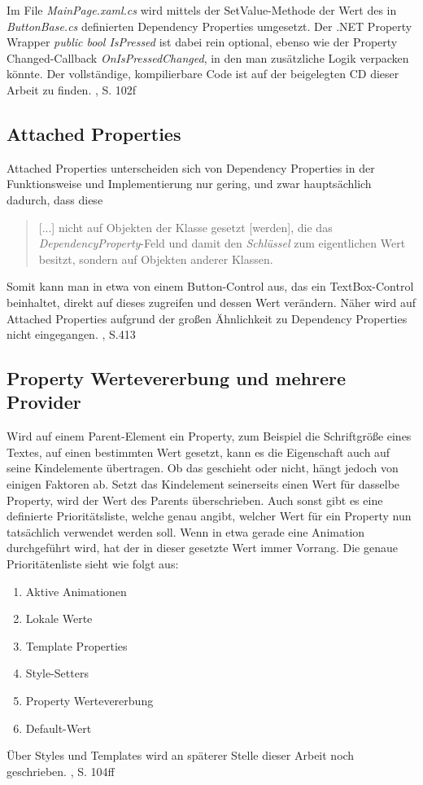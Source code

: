 \documentclass[a4paper,bibtotoc,oneside]{scrbook}
\begin{document}
Im File \textit{MainPage.xaml.cs} wird mittels der SetValue-Methode der Wert des in \textit{ButtonBase.cs} definierten Dependency Properties umgesetzt.
\newline
Der .NET Property Wrapper \textit{public bool IsPressed} ist dabei rein optional, ebenso wie der Property Changed-Callback \textit{OnIsPressedChanged}, in den man zusätzliche Logik verpacken könnte. Der vollständige, kompilierbare Code ist auf der beigelegten CD dieser Arbeit zu finden. \cite{ana12}, S. 102f

\subsection[Attached Properties]{Attached Properties}
Attached Properties unterscheiden sich von Dependency Properties in der Funktionsweise und Implementierung nur gering, und zwar hauptsächlich dadurch, dass diese \begin{quote}[...] nicht auf Objekten der Klasse gesetzt [werden], die das \textit{DependencyProperty}-Feld und damit den \textit{Schlüssel} zum eigentlichen Wert besitzt, sondern auf Objekten anderer Klassen.\end{quote}
Somit kann man in etwa von einem Button-Control aus, das ein TextBox-Control beinhaltet, direkt auf dieses zugreifen und dessen Wert verändern. Näher wird auf Attached Properties aufgrund der großen Ähnlichkeit zu Dependency Properties nicht eingegangen. \cite{wpf10}, S.413

\subsection[Property Wertevererbung und mehrere Provider]{Property Wertevererbung und mehrere Provider}
Wird auf einem Parent-Element ein Property, zum Beispiel die Schriftgröße eines Textes, auf einen bestimmten Wert gesetzt, kann es die Eigenschaft auch auf seine Kindelemente übertragen. Ob das geschieht oder nicht, hängt jedoch von einigen 
Faktoren ab. Setzt das Kindelement seinerseits einen Wert für dasselbe Property, wird der Wert des Parents überschrieben. 
\newline
\newline
Auch sonst gibt es eine definierte Prioritätsliste, welche genau angibt, welcher Wert für ein Property nun tatsächlich verwendet werden soll. Wenn in etwa gerade eine Animation durchgeführt wird, hat der in dieser gesetzte Wert immer Vorrang. Die genaue Prioritätenliste sieht wie folgt aus:
\begin{enumerate}
\item Aktive Animationen
\item Lokale Werte
\item Template Properties
\item Style-Setters
\item Property Wertevererbung
\item Default-Wert
\end{enumerate}
Über Styles und Templates wird an späterer Stelle dieser Arbeit noch geschrieben.
\cite{ana12}, S. 104ff
\end{document}
